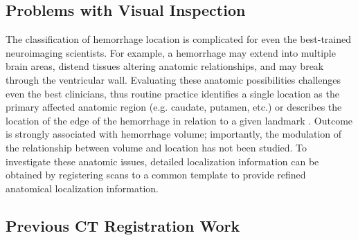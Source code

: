 \documentclass[10pt]{article}\usepackage[]{graphicx}\usepackage[]{color}
\begin{document}
\subsection{Problems with Visual Inspection}
The classification of hemorrhage location is complicated for even the best-trained neuroimaging scientists. For example, a hemorrhage may extend into multiple brain areas, distend tissues altering anatomic relationships, and may break through the ventricular wall.  Evaluating these anatomic possibilities challenges even the best clinicians, thus routine practice identifies a single location as the primary affected anatomic region (e.g. caudate, putamen, etc.) or describes the location of the edge of the hemorrhage in relation to a given landmark \citep{ziai_multicenter_2013}.  Outcome is strongly associated with hemorrhage volume; importantly, the modulation of the relationship between volume and location has not been studied.  To investigate these anatomic issues, detailed localization information can be obtained by registering scans to a common template to provide refined anatomical localization information.  





\subsection{Previous CT Registration Work}
\end{document}
